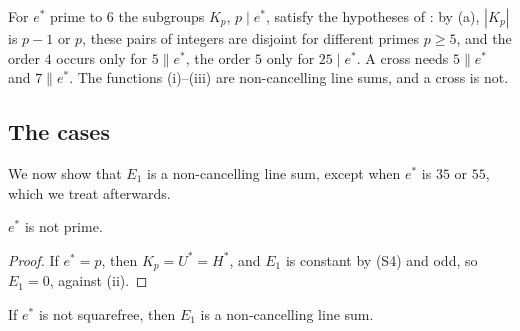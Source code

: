 For $e^{*}$ prime to $6$ the subgroups $K_{p}$, $p\mid e^{*}$, satisfy the
hypotheses of : by (a), $|K_{p}|$ is $p-1$ or $p$,
these pairs of integers are disjoint for different primes $p\ge5$, and the
order $4$ occurs only for $5\parallel e^{*}$, the order $5$ only for
$25\mid e^{*}$. A cross needs $5\parallel e^{*}$ and $7\parallel e^{*}$. The
functions (i)--(iii) are non-cancelling line sums, and a cross is not.

\subsection{The cases}
We now show that $E_{1}$ is a non-cancelling line sum, except when $e^{*}$ is
$35$ or $55$, which we treat afterwards.

\begin{lemma}\label{lem:eprime}
$e^{*}$ is not prime.
\end{lemma}

\begin{proof}
If $e^{*}=p$, then $K_{p}=U^{*}=H^{*}$, and $E_{1}$ is constant by (S4) and
odd, so $E_{1}=0$, against (ii).
\end{proof}

\begin{proposition}\label{prop:nonsquarefree}
If $e^{*}$ is not squarefree, then $E_{1}$ is a non-cancelling line sum.
\end{proposition}

